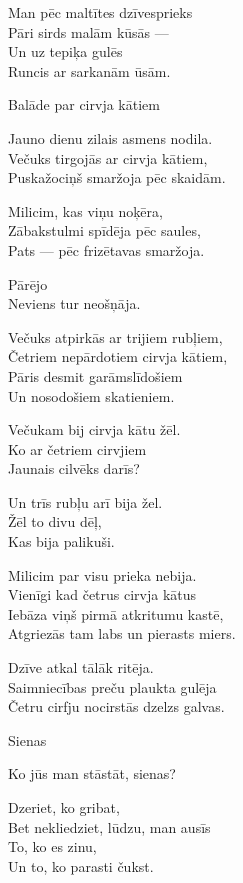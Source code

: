 \documentclass[14pt]{extarticle}
\begin{document}
Man pēc maltītes dzīvesprieks\\
Pāri sirds malām kūsās ---\\
Un uz tepiķa gulēs\\
Runcis ar sarkanām ūsām.


\newpage

{\large \sc Balāde par cirvja kātiem}

Jauno dienu zilais asmens nodila.\\
Večuks tirgojās ar cirvja kātiem,\\
Puskažociņš smaržoja pēc skaidām.

Milicim, kas viņu noķēra,\\
Zābakstulmi spīdēja pēc saules,\\
Pats --- pēc frizētavas smaržoja.

Pārējo\\
Neviens tur neošņāja.

Večuks atpirkās ar trijiem rubļiem,\\
Četriem nepārdotiem cirvja kātiem,\\
Pāris desmit garāmslīdošiem\\
Un nosodošiem skatieniem.

Večukam bij cirvja kātu žēl.\\
Ko ar četriem cirvjiem\\
Jaunais cilvēks darīs?

Un trīs rubļu arī bija žel.\\
Žēl to divu dēļ,\\
Kas bija palikuši.

Milicim par visu prieka nebija.\\
Vienīgi kad četrus cirvja kātus\\
Iebāza viņš pirmā atkritumu kastē,\\
Atgriezās tam labs un pierasts miers.

Dzīve atkal tālāk ritēja.\\
Saimniecības preču plaukta gulēja\\
Četru cirfju nocirstās dzelzs galvas.


\newpage

{\large \sc Sienas}

Ko jūs man stāstāt, sienas?

Dzeriet, ko gribat,\\
Bet nekliedziet, lūdzu, man ausīs\\
To, ko es zinu,\\
Un to, ko parasti čukst.
\end{document}
